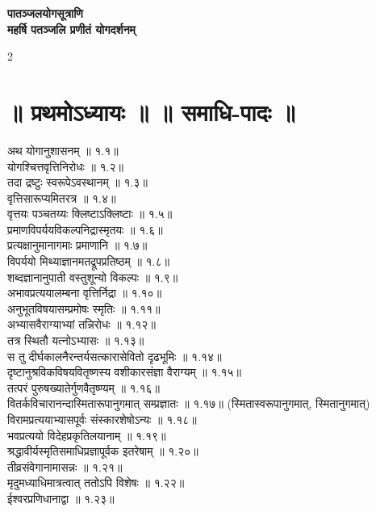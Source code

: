 \documentclass[9pt,a4paper,landscape]{article}
\begin{document}

\begin{center}
\Large{\textbf{पातञ्जलयोगसूत्राणि\\ महर्षि पतञ्जलि प्रणीतं योगदर्शनम्}}  
\end{center}

\begin{multicols}{2}

\section*{॥ प्रथमोऽध्यायः ॥  ॥ समाधि-पादः ॥}
\begin{flushleft}
\devanagarifont
अथ योगानुशासनम् ॥ १.१॥\\
योगश्चित्तवृत्तिनिरोधः ॥ १.२॥\\
तदा द्रष्टुः स्वरूपेऽवस्थानम् ॥ १.३॥\\
वृत्तिसारूप्यमितरत्र ॥ १.४॥\\
वृत्तयः पञ्चतय्यः क्लिष्टाऽक्लिष्टाः ॥ १.५॥\\
प्रमाणविपर्ययविकल्पनिद्रास्मृतयः ॥ १.६॥\\
प्रत्यक्षानुमानागमाः प्रमाणानि ॥ १.७॥\\
विपर्ययो मिथ्याज्ञानमतद्रूपप्रतिष्ठम् ॥ १.८॥\\
शब्दज्ञानानुपाती वस्तुशून्यो विकल्पः ॥ १.९॥\\
अभावप्रत्ययालम्बना वृत्तिर्निद्रा ॥ १.१०॥\\
अनुभूतविषयासम्प्रमोषः स्मृतिः ॥ १.११॥\\
अभ्यासवैराग्याभ्यां तन्निरोधः ॥ १.१२॥\\
तत्र स्थितौ यत्नोऽभ्यासः ॥ १.१३॥\\
स तु दीर्घकालनैरन्तर्यसत्कारासेवितो दृढभूमिः ॥ १.१४॥\\
दृष्टानुश्रविकविषयवितृष्णस्य वशीकारसंज्ञा वैराग्यम् ॥ १.१५॥\\
तत्परं पुरुषख्यातेर्गुणवैतृष्ण्यम् ॥ १.१६॥\\
वितर्कविचारानन्दास्मितारूपानुगमात् सम्प्रज्ञातः ॥ १.१७॥ (स्मितास्वरूपानुगमात्, स्मितानुगमात्) \\
विरामप्रत्ययाभ्यासपूर्वः संस्कारशेषोऽन्यः ॥ १.१८॥\\
भवप्रत्ययो विदेहप्रकृतिलयानाम् ॥ १.१९॥\\
श्रद्धावीर्यस्मृतिसमाधिप्रज्ञापूर्वक इतरेषाम् ॥ १.२०॥\\
तीव्रसंवेगानामासन्नः ॥ १.२१॥\\
मृदुमध्याधिमात्रत्वात् ततोऽपि विशेषः ॥ १.२२॥\\
ईश्वरप्रणिधानाद्वा ॥ १.२३॥\\

\end{flushleft}
\end{multicols}
\end{document}
